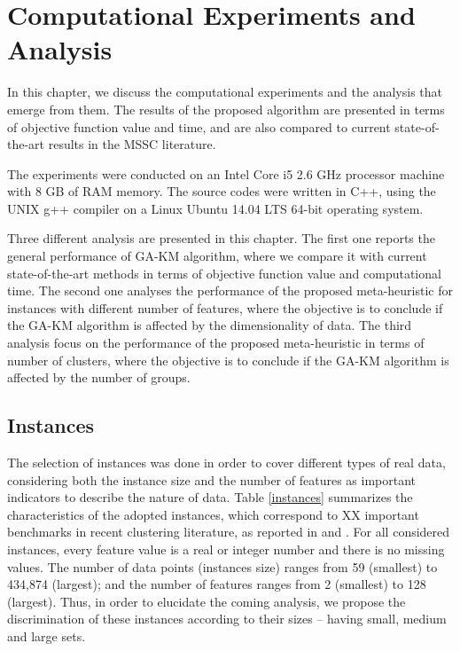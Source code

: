 \chapter{Computational Experiments and Analysis}
In this chapter, we discuss the computational experiments and the analysis that emerge from them. The results of the proposed algorithm are presented in terms of objective function value and time, and are also compared to current state-of-the-art results in the MSSC literature.

The experiments were conducted on an Intel Core i5 2.6 GHz processor machine with 8 GB of RAM memory. The source codes were written in C++, using the UNIX g++ compiler on a Linux Ubuntu 14.04 LTS 64-bit operating system.

Three different analysis are presented in this chapter. The first one reports the general performance of GA-KM algorithm, where we compare it with current state-of-the-art methods in terms of objective function value and computational time. The second one analyses the performance of the proposed meta-heuristic for instances with different number of features, where the objective is to conclude if the GA-KM algorithm is affected by the dimensionality of data. The third analysis focus on the performance of the proposed meta-heuristic in terms of number of clusters, where the objective is to conclude if the GA-KM algorithm is affected by the number of groups.

\section{Instances}
The selection of instances was done in order to cover different types of real data, considering both the instance size and the number of features as important indicators to describe the nature of data. Table \ref{instances} summarizes the characteristics of the adopted instances, which correspond to XX important benchmarks in recent clustering literature, as reported in \cite{Ordin2014} and \cite{Bagirov2016}. For all considered instances, every feature value is a real or integer number and there is no missing values. The number of data points (instances size) ranges from 59 (smallest) to 434,874 (largest); and the number of features ranges from 2 (smallest) to 128 (largest). Thus, in order to elucidate the coming analysis, we propose the discrimination of these instances according to their sizes -- having small, medium and large sets. %

